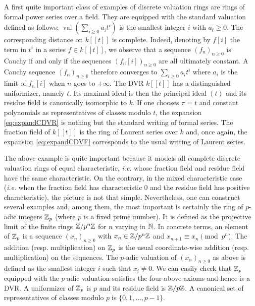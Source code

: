 \documentclass{article}
\DeclareMathOperator{\val}{val}
\begin{document}
A first quite important class of examples of discrete valuation rings 
are rings of formal power series over a field. They are equipped with 
the standard valuation defined as follows: $\val(\sum_{i \geq 0} a_i 
t^i)$ is the smallest integer $i$ with $a_i \geq 0$. The corresponding 
distance on $k[[t]]$ is complete. Indeed, denoting by $f[i]$ the term in 
$t^i$ in a series $f \in k[[t]]$, we observe that a sequence $(f_n)_{n 
\geq 0}$ is Cauchy if and only if the sequences $(f_n[i])_{n \geq 0}$ 
are all ultimately constant. A Cauchy sequence $(f_n)_{n \geq 0}$ 
therefore converges to $\sum_{i \geq 0} a_i t^i$ where $a_i$ is the 
limit of $f_n[i]$ when $n$ goes to $+\infty$.
The DVR $k[[t]]$ has a distinguished uniformizer, namely $t$. Its 
maximal ideal is then the principal ideal $(t)$ and its residue field
is canonically isomorphic to $k$. 
If one chooses $\pi = t$ and constant polynomials as representatives of 
classes modulo $t$, the expansion \eqref{eq:expandCDVR} is nothing but 
the standard writing of formal series.
The fraction field of $k[[t]]$ is the ring of Laurent series over $k$
and, once again, the expansion \eqref{eq:expandCDVF} corresponds to the
usual writing of Laurent series.

\medskip

The above example is quite important because it models all complete 
discrete valuation rings of equal characteristic, \emph{i.e.} whose 
fraction field and residue field have the same characteristic. On the 
contrary, in the mixed characteristic case (\emph{i.e.} when the 
fraction field has characteristic $0$ and the residue field has positive 
characteristic), the picture is not that simple.
Nevertheless, one can construct several examples and, among them, the 
most important is certainly the ring of $p$-adic integers $\mathbb Z_p$ (where 
$p$ is a fixed prime number). It is defined as the projective limit of 
the finite rings $\mathbb Z/p^n\mathbb Z$ for $n$ varying in $\mathbb N$. In concrete terms, 
an element of $\mathbb Z_p$ is a sequence $(x_n)_{n \geq 0}$ with $x_n \in 
\mathbb Z/p^n\mathbb Z$ and $x_{n+1} \equiv x_n \pmod{p^n}$. The addition (resp. 
multiplication) on $\mathbb Z_p$ is the usual coordinate-wise addition (resp. 
multiplication) on the sequences. The $p$-adic valuation of $(x_n)_{n 
\geq 0}$ as above is defined as the smallest integer $i$ such that $x_i 
\neq 0$. We can easily check that $\mathbb Z_p$ equipped with the $p$-adic 
valuation satisfies the four above axioms and hence is a DVR. A
uniformizer of $\mathbb Z_p$ is $p$ and its residue field is $\mathbb Z/p\mathbb Z$. A
canonical set of representatives of classes modulo $p$ is $\{0, 1,
\ldots, p-1\}$.
\end{document}
